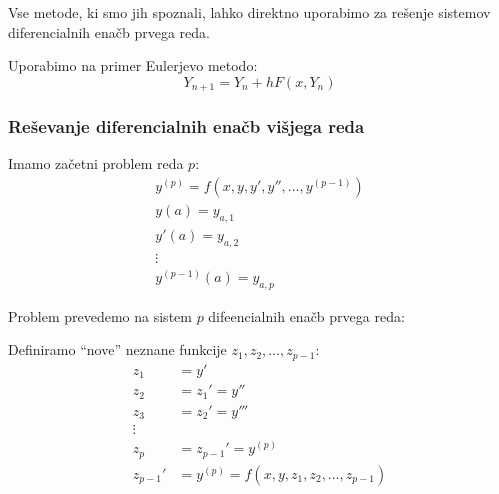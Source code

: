\documentclass[a4paper,12pt]{article}
\theoremstyle{definition}
\theoremstyle{remark}
\begin{document}
Vse metode, ki smo jih spoznali, lahko direktno uporabimo za rešenje sistemov diferencialnih enačb prvega reda.

Uporabimo na primer Eulerjevo metodo:
\begin{equation*}
    Y_{n+1} = Y_n + h F(x, Y_n)
\end{equation*}

\subsubsection{Reševanje diferencialnih enačb višjega reda}
Imamo začetni problem reda $p$:
\begin{gather*}
    y^{(p)} = f(x, y, y', y'', \dots, y^{(p-1)}) \\
    y(a) = y_{a, 1} \\
    y'(a) = y_{a, 2} \\
    \vdots \\
    y^{(p-1)}(a) = y_{a, p}
\end{gather*}

Problem prevedemo na sistem $p$ difeencialnih enačb prvega reda:

Definiramo ``nove'' neznane funkcije $z_1, z_2, \dots, z_{p-1}$:
\begin{align*}
    z_1 &= y'\\
    z_2 &= z_1' = y'' \\
    z_3 &= z_2' = y''' \\
    \vdots \\
    z_{p} &= z_{p-1}' = y^{(p)} \\
    z_{p-1}' &= y^{(p)} = f(x, y, z_1, z_2, \dots, z_{p-1})
\end{align*}
\end{document}
